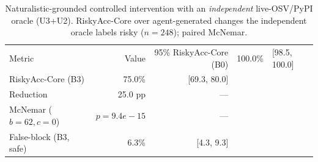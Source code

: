 \begin{table}[t]\centering
\caption{Naturalistic-grounded controlled intervention with an \emph{independent} live-OSV/PyPI oracle (U3+U2). RiskyAcc-Core over agent-generated changes the independent oracle labels risky ($n=248$); paired McNemar.}
\label{tab:e1a-indep}
\begin{tabular}{lrr}
\toprule
Metric & Value & 95\%%
\midrule
RiskyAcc-Core (B0) & 100.0\% & [98.5, 100.0] \\
RiskyAcc-Core (B3) & 75.0\% & [69.3, 80.0] \\
Reduction & 25.0 pp & --- \\
McNemar ($b{=}62,c{=}0$) & $p{=}9.4e-15$ & --- \\
False-block (B3, safe) & 6.3\% & [4.3, 9.3] \\
\bottomrule
\end{tabular}
\end{table}
